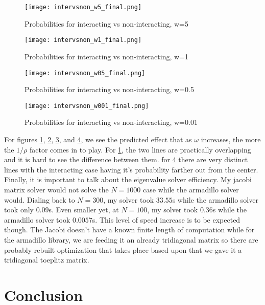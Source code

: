 \documentclass[%
 reprint,
 amsmath,amssymb,
 aps,
]{revtex4-1}
\begin{document}
\begin{figure}[p]
\texttt{[image: intervsnon\_w5\_final.png]}
\caption{Probabilities for interacting vs non-interacting, w=5}
\label{fig:w5}
\end{figure}

\begin{figure}[p]
\texttt{[image: intervsnon\_w1\_final.png]}
\caption{Probabilities for interacting vs non-interacting, w=1}
\label{fig:w1}
\end{figure}

\begin{figure}[p]
\texttt{[image: intervsnon\_w05\_final.png]}
\caption{Probabilities for interacting vs non-interacting, w=0.5}
\label{fig:w05}
\end{figure}

\begin{figure}[p]
\texttt{[image: intervsnon\_w001\_final.png]}
\caption{Probabilities for interacting vs non-interacting, w=0.01}
\label{fig:w001}
\end{figure}


For figures \ref{fig:w5}, \ref{fig:w1}, \ref{fig:w05}, and \ref{fig:w001}, we see the predicted effect that as $\omega$ increases, the more the $1/\rho$ factor comes in to play. For \ref{fig:w5}, the two lines are practically overlapping and it is hard to see the difference between them. for \ref{fig:w001} there are very distinct lines with the interacting case having it's probability farther out from the center. \\

Finally, it is important to talk about the eigenvalue solver efficiency. My jacobi matrix solver would not solve the $N=1000$ case while the armadillo solver would. Dialing back to $N=300$, my solver took $33.55$s while the armadillo solver took only  $0.09$s. Even smaller yet, at $N=100$, my solver took $0.36$s while the armadillo solver took $0.0057$s. This level of speed increase is to be expected though. The Jacobi doesn't have a known finite length of computation while for the armadillo library, we are feeding it an already tridiagonal matrix so there are probably rebuilt optimization that takes place based upon that we gave it a tridiagonal toeplitz matrix. 


\section{\label{sec:level1}Conclusion}
\end{document}
